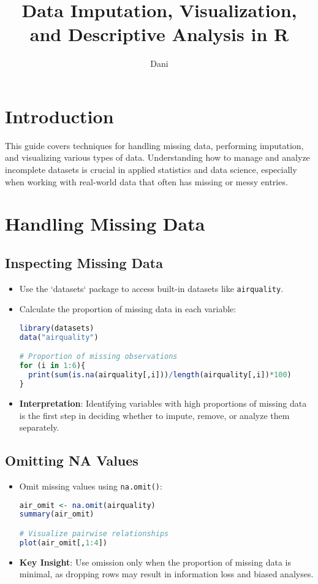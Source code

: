 \documentclass{article}
\title{Data Imputation, Visualization, and Descriptive Analysis in R}
\author{Dani}
\date{}
\begin{document}
\maketitle

\section{Introduction}
This guide covers techniques for handling missing data, performing imputation, and visualizing various types of data. Understanding how to manage and analyze incomplete datasets is crucial in applied statistics and data science, especially when working with real-world data that often has missing or messy entries.

\section{Handling Missing Data}
\subsection{Inspecting Missing Data}
\begin{itemize}
    \item Use the `datasets` package to access built-in datasets like \texttt{airquality}.
    \item Calculate the proportion of missing data in each variable:
\begin{lstlisting}[language=R]
library(datasets)
data("airquality")

# Proportion of missing observations
for (i in 1:6){
  print(sum(is.na(airquality[,i]))/length(airquality[,i])*100)
}
\end{lstlisting}

\item \textbf{Interpretation}: Identifying variables with high proportions of missing data is the first step in deciding whether to impute, remove, or analyze them separately.
\end{itemize}

\subsection{Omitting NA Values}
\begin{itemize}
    \item Omit missing values using \texttt{na.omit()}:
\begin{lstlisting}[language=R]
air_omit <- na.omit(airquality)
summary(air_omit)

# Visualize pairwise relationships
plot(air_omit[,1:4])
\end{lstlisting}

\item \textbf{Key Insight}: Use omission only when the proportion of missing data is minimal, as dropping rows may result in information loss and biased analyses.
\end{itemize}
\end{document}

